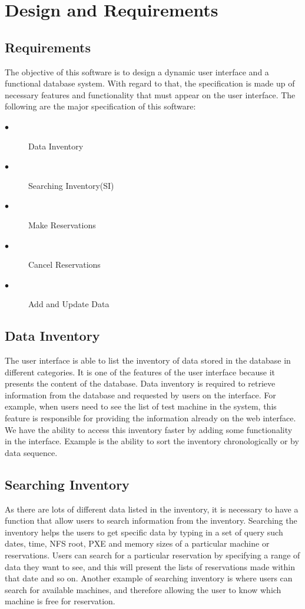 \chapter{Design and Requirements}
\label{chap:figtab}
\label{chap}
\section{Requirements}
The objective of this software is to  design a dynamic user interface and a functional database system. With regard to that, the specification is made up of necessary features and functionality that must appear on the user interface. The following are the major specification of this software:
\begin{description}
\item[$\bullet$] Data Inventory
\item[$\bullet$] Searching Inventory(SI)
\item[$\bullet$] Make Reservations
\item[$\bullet$] Cancel Reservations
\item[$\bullet$] Add and Update Data
\end{description}
\section*{Data Inventory}
The user interface is able to list the inventory of data stored in the database in different categories. It is one of the features of the user interface because it presents the content of the database. Data inventory is required to retrieve information from the database and requested by users on the interface. For example, when users need to see the list of test machine in the system, this feature is responsible for providing the information already on the web interface. We have the ability to access this inventory faster by adding some functionality in the interface. Example is the ability to sort the inventory chronologically or by data sequence. 
\section*{Searching Inventory} \label{searchinventory}
As there are lots of different data listed in the inventory, it is necessary to have a function that allow users to search information from the inventory. Searching the inventory helps the users to get specific data by typing in a set of query such dates, time, NFS root, PXE and memory sizes of a particular machine or reservations. Users can search for a particular reservation by specifying a range of data they want to see, and this will present the lists of reservations made within that date and so on. Another example of searching inventory is where users can search for available machines, and therefore allowing the user to know which machine is free for reservation.
